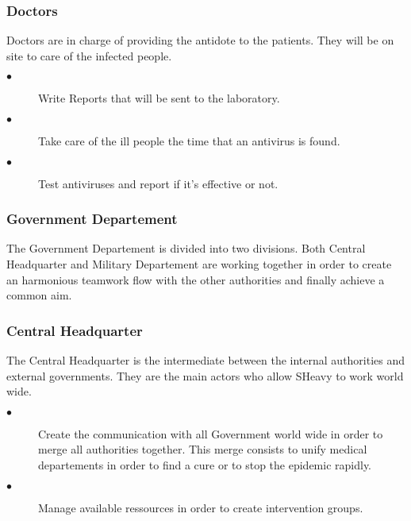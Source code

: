 \subsubsection{Doctors}
Doctors are in charge of providing the antidote to the patients. They will be on
site to care of the infected people. \\
\begin{description}
 \item[$\bullet$] Write Reports that will be sent to the laboratory.
 \item[$\bullet$] Take care of the ill people the time that an antivirus is
 found.
 \item[$\bullet$] Test antiviruses and report if it's effective or not.
 \end{description} 

\subsubsection{Government Departement}
The Government Departement is divided into two divisions. Both Central
Headquarter and Military Departement are working together in order to create an harmonious teamwork 
flow with the other authorities and finally achieve a common aim.\\

\subsubsection{Central Headquarter}
The Central Headquarter is the intermediate between the internal authorities and
external governments. They are the main actors who allow SHeavy to work world
wide.\\
\begin{description} 
 \item[$\bullet$] Create the communication with all Government world wide in
 order to merge all authorities together. This merge consists to unify medical
 departements in order to find a cure or to stop the epidemic rapidly.\\
 \item[$\bullet$] Manage available ressources in order to create intervention
 groups.\\ 
\end{description} 

